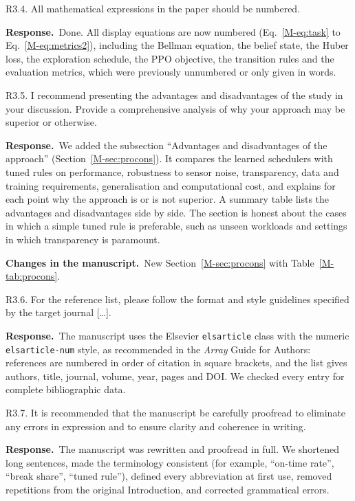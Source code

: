 \documentclass[11pt]{article}
\newcommand{\resp}{\par\smallskip\noindent\textbf{Response.}~}
\newcommand{\change}{\par\smallskip\noindent\textbf{Changes in the manuscript.}~}
\newcommand{\Sec}[1]{Section~\ref{M-#1}}
\newcommand{\Eq}[1]{Eq.~\eqref{M-#1}}
\newcommand{\Tab}[1]{Table~\ref{M-#1}}
\begin{document}
\begin{rcomment}{R3.4.}
All mathematical expressions in the paper should be numbered.
\end{rcomment}
\resp Done. All display equations are now numbered (\Eq{eq:task} to \Eq{eq:metrics2}), including the Bellman equation, the belief state, the Huber loss, the exploration schedule, the PPO objective, the transition rules and the evaluation metrics, which were previously unnumbered or only given in words.

\begin{rcomment}{R3.5.}
I recommend presenting the advantages and disadvantages of the study in your discussion. Provide a comprehensive analysis of why your approach may be superior or otherwise.
\end{rcomment}
\resp We added the subsection ``Advantages and disadvantages of the approach'' (\Sec{sec:procons}). It compares the learned schedulers with tuned rules on performance, robustness to sensor noise, transparency, data and training requirements, generalisation and computational cost, and explains for each point why the approach is or is not superior. A summary table lists the advantages and disadvantages side by side. The section is honest about the cases in which a simple tuned rule is preferable, such as unseen workloads and settings in which transparency is paramount.
\change New \Sec{sec:procons} with \Tab{tab:procons}.

\begin{rcomment}{R3.6.}
For the reference list, please follow the format and style guidelines specified by the target journal [\dots].
\end{rcomment}
\resp The manuscript uses the Elsevier \texttt{elsarticle} class with the numeric \texttt{elsarticle-num} style, as recommended in the \emph{Array} Guide for Authors: references are numbered in order of citation in square brackets, and the list gives authors, title, journal, volume, year, pages and DOI. We checked every entry for complete bibliographic data.

\begin{rcomment}{R3.7.}
It is recommended that the manuscript be carefully proofread to eliminate any errors in expression and to ensure clarity and coherence in writing.
\end{rcomment}
\resp The manuscript was rewritten and proofread in full. We shortened long sentences, made the terminology consistent (for example, ``on-time rate'', ``break share'', ``tuned rule''), defined every abbreviation at first use, removed repetitions from the original Introduction, and corrected grammatical errors.
\end{document}
